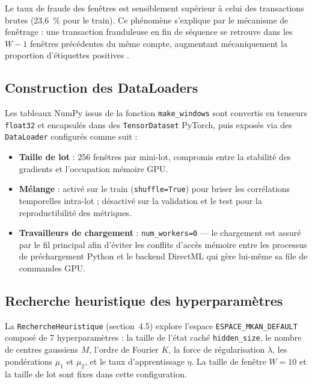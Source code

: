 \documentclass[11pt,a4paper,oneside]{report}
\theoremstyle{definition}
\theoremstyle{remark}
\begin{document}
Le taux de fraude des fenêtres est sensiblement supérieur à celui des transactions brutes (23,6~\% pour le train). Ce phénomène s'explique par le mécanisme de fenêtrage : une transaction frauduleuse en fin de séquence se retrouve dans les $W - 1$ fenêtres précédentes du même compte, augmentant mécaniquement la proportion d'étiquettes positives \citep{Zhou2025}.

\subsection{Construction des DataLoaders}
\label{subsec:dataloaders}

Les tableaux NumPy issus de la fonction \texttt{make\_windows} sont convertis en tenseurs \texttt{float32} et encapsulés dans des \texttt{TensorDataset} PyTorch, puis exposés via des \texttt{DataLoader} configurés comme suit :

\begin{itemize}
    \item \textbf{Taille de lot} : 256 fenêtres par mini-lot, compromis entre la stabilité des gradients et l'occupation mémoire GPU.
    \item \textbf{Mélange} : activé sur le train (\texttt{shuffle=True}) pour briser les corrélations temporelles intra-lot ; désactivé sur la validation et le test pour la reproductibilité des métriques.
    \item \textbf{Travailleurs de chargement} : \texttt{num\_workers=0} --- le chargement est assuré par le fil principal afin d'éviter les conflits d'accès mémoire entre les processus de préchargement Python et le backend DirectML qui gère lui-même sa file de commandes GPU.
\end{itemize}

\subsection{Recherche heuristique des hyperparamètres}
\label{subsec:heuristic_exec}

La \texttt{RechercheHeuristique} (section~4.5) explore l'espace \texttt{ESPACE\_MKAN\_DEFAULT} composé de 7 hyperparamètres : la taille de l'état caché \texttt{hidden\_size}, le nombre de centres gaussiens $M$, l'ordre de Fourier $K$, la force de régularisation $\lambda$, les pondérations $\mu_1$ et $\mu_2$, et le taux d'apprentissage $\eta$. La taille de fenêtre $W = 10$ et la taille de lot sont fixes dans cette configuration.
\end{document}
